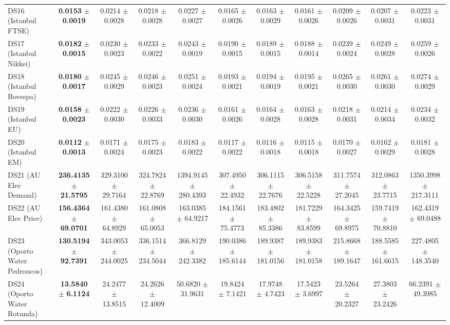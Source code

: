\begin{table}[t]
{{\begin{tabular}{lcccccccccc}
DS16 (Istanbul FTSE) & \textbf{0.0153} $\pm$ \textbf{0.0019} & 0.0214 $\pm$ 0.0028 & 0.0218 $\pm$ 0.0028 & 0.0227 $\pm$ 0.0027 & 0.0165 $\pm$ 0.0026 & 0.0163 $\pm$ 0.0029 & 0.0161 $\pm$ 0.0026 & 0.0209 $\pm$ 0.0026 & 0.0207 $\pm$ 0.0031 & 0.0223 $\pm$ 0.0031 \\
DS17 (Istanbul Nikkei) & \textbf{0.0182} $\pm$ \textbf{0.0015} & 0.0230 $\pm$ 0.0023 & 0.0233 $\pm$ 0.0022 & 0.0243 $\pm$ 0.0019 & 0.0190 $\pm$ 0.0015 & 0.0189 $\pm$ 0.0015 & 0.0188 $\pm$ 0.0014 & 0.0239 $\pm$ 0.0024 & 0.0249 $\pm$ 0.0028 & 0.0259 $\pm$ 0.0026 \\
DS18 (Istanbul Bovespa) & \textbf{0.0180} $\pm$ \textbf{0.0017} & 0.0245 $\pm$ 0.0029 & 0.0246 $\pm$ 0.0023 & 0.0251 $\pm$ 0.0024 & 0.0193 $\pm$ 0.0021 & 0.0194 $\pm$ 0.0019 & 0.0195 $\pm$ 0.0021 & 0.0265 $\pm$ 0.0030 & 0.0261 $\pm$ 0.0030 & 0.0274 $\pm$ 0.0029 \\
DS19 (Istanbul EU) & \textbf{0.0158} $\pm$ \textbf{0.0023} & 0.0222 $\pm$ 0.0030 & 0.0226 $\pm$ 0.0033 & 0.0236 $\pm$ 0.0030 & 0.0161 $\pm$ 0.0026 & 0.0164 $\pm$ 0.0028 & 0.0163 $\pm$ 0.0028 & 0.0218 $\pm$ 0.0031 & 0.0214 $\pm$ 0.0034 & 0.0234 $\pm$ 0.0032 \\
DS20 (Istanbul EM) & \textbf{0.0112} $\pm$ \textbf{0.0013} & 0.0171 $\pm$ 0.0024 & 0.0175 $\pm$ 0.0023 & 0.0183 $\pm$ 0.0022 & 0.0117 $\pm$ 0.0022 & 0.0116 $\pm$ 0.0018 & 0.0115 $\pm$ 0.0018 & 0.0170 $\pm$ 0.0027 & 0.0162 $\pm$ 0.0029 & 0.0181 $\pm$ 0.0028 \\
DS21 (AU Elec Demand) & \textbf{236.4135} $\pm$ \textbf{21.5795} & 329.3100 $\pm$ 29.7164 & 324.7824 $\pm$ 22.8769 & 1394.9145 $\pm$ 280.4393 & 307.4950 $\pm$ 22.4932 & 306.1115 $\pm$ 22.7676 & 306.5158 $\pm$ 22.5228 & 311.7574 $\pm$ 27.2045 & 312.0863 $\pm$ 23.7715 & 1350.3998 $\pm$ 217.3111 \\
DS22 (AU Elec Price) & \textbf{156.4364} $\pm$ \textbf{69.0701} & 161.4380 $\pm$ 64.8929 & 161.0808 $\pm$ 65.0053 & 163.0385 $\pm$ 64.9217 & 184.1561 $\pm$ 75.4773 & 183.4802 $\pm$ 85.3386 & 181.7229 $\pm$ 83.8599 & 164.3425 $\pm$ 69.8975 & 159.7419 $\pm$ 70.8810 & 162.4319 $\pm$ 69.0488 \\
DS23 (Oporto Water Pedroucos) & \textbf{130.5194} $\pm$ \textbf{92.7391} & 343.0053 $\pm$ 244.0025 & 336.1514 $\pm$ 234.5044 & 366.8129 $\pm$ 242.3382 & 190.0386 $\pm$ 185.6144 & 189.9387 $\pm$ 181.0156 & 189.9383 $\pm$ 181.0158 & 215.8668 $\pm$ 189.1647 & 188.5585 $\pm$ 161.6615 & 227.4805 $\pm$ 148.3540 \\
DS24 (Oporto Water Rotunda) & \textbf{13.5840} $\pm$ \textbf{6.1124} & 24.2477 $\pm$ 13.8515 & 24.2626 $\pm$ 12.4009 & 50.6820 $\pm$ 31.9631 & 19.8424 $\pm$ 7.1421 & 17.9748 $\pm$ 4.7423 & 17.5423 $\pm$ 3.6997 & 23.5264 $\pm$ 20.2327 & 27.3803 $\pm$ 23.2426 & 66.2391 $\pm$ 49.3985 \\
\bottomrule
\end{tabular}%
}%
}
\end{table}
